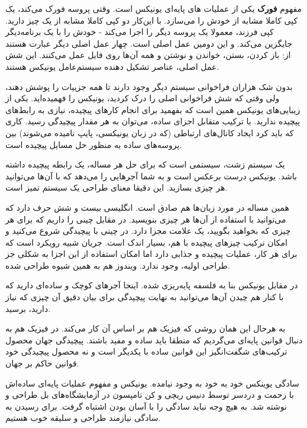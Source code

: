 مفهوم \textbf{فورک} یکی از عملیات های پایه‌ای یونیکس
است. وقتی پروسه فورک می‌کند، یک کپی کاملا مشابه از خودش را می‌سازد. با
این‌کار دو کپی کاملا مشابه از یک چیز دارید. کپی فرزند، معمولا یک پروسه
دیگر را اجرا می‌کند - خودش را با یک برنامه‌دیگر جایگزین می‌کند. و این
دومین عمل اصلی است. چهار عمل اصلی دیگر عبارت هستند از: باز کردن، بستن،
خواندن و نوشتن و همه آن‌ها روی فایل عمل می‌کنند. این شش عمل اصلی، عناصر
تشکیل دهنده سیستم‌عامل یونیکس هستند.

بدون شک هزاران فراخوانی سیستم دیگر وجود دارند تا همه جزییات را پوشش
دهند، ولی وقتی که شش فراخوانی اصلی را درک کردید، یونیکس را
فهمیده‌اید. یکی از زیبایی‌های یونیکس همین است که بفهمید برای انجام
کارهای پیچیده، نیازی به رابط‌های پیچیده ندارید. با ترکیب متقابل اجزای
ساده، می‌توان به هر مقدار پیچیدگی‌ رسید. کاری که باید کرد ایجاد کانال‌های
ارتباطی (که در زبان یونیکسی، پایپ نامیده می‌شوند) بین پروسه‌های ساده به
منظور حل مسایل پیچیده است.

یک سیستم زشت، سیستمی است که برای حل هر مساله، یک رابطه پیچیده داشته
باشد. یونیکس درست برعکس است و به شما آجرهایی را می‌دهد که با آن‌ها
می‌توانید هر چیزی بسازید. این دقیقا معنای طراحی یک سیستم تمیز است.

همین مساله در مورد زبان‌ها هم صادق است. انگلیسی بیست و شش حرف دارد که
می‌توانید با استفاده از آن‌ها هر چیزی بنویسید. در مقابل چینی را داریم که
برای هر چیزی که بخواهید بگویید، یک علامت مجزا دارد. در چینی با پیچیدگی
شروع می‌کنید و امکان ترکیب چیزهای پیچیده با هم، بسیار اندک است. جریان
شبیه رویکرد  است که برای هر کار، عملیات پیچیده و جذابی دارد اما
امکان استفاده از این اجزا به شکلی جز طراحی اولیه، وجود ندارد. ویندوز
هم به همین شیوه طراحی شده.

در مقابل یونیکس بنا به فلسفه  پایه‌ریزی
شده. اینجا آجرهای کوچک و ساده‌ای دارید که با کنار هم چیدن آن‌ها می‌توانید
به نهایت پیچیدگی برای بیان دقیق آن چیزی که نیاز دارید، برسید.

به هرحال این همان روشی که فیزیک هم بر اساس آن کار می‌کند. در فیزیک هم
به دنبال قوانین پایه‌ای می‌گردیم که منطقا باید ساده و مفید
باشند. پیچیدگی جهان محصول ترکیب‌های شگفت‌انگیز این قوانین ساده با یکدیگر
است و نه محصول پیچیدگی خود قوانین حاکم بر جهان.

سادگی یوینکس خود به خود به وجود نیامده. یونیکس و مفهوم عملیات پایه‌ای
ساده‌اش با زحمت و دردسر توسط دنیس ریچی و کن
تامپسون در آزمایشگاه‌های بل طراحی و نوشته
شد. به هیچ وجه نباید سادگی را با آسان بودن اشتباه گرفت. برای رسیدن به
سادگی نیازمند طراحی و سلیقه خوب هستیم.

